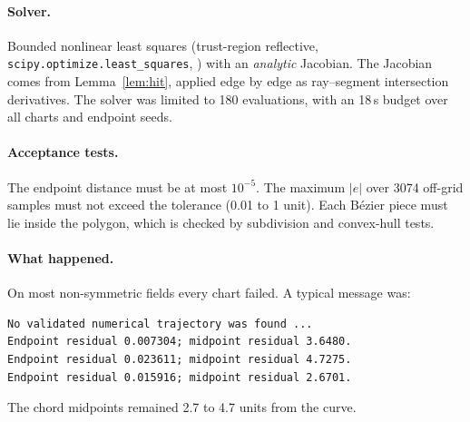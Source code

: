 \documentclass[11pt,a4paper]{article}
\numberwithin{equation}{section}
\theoremstyle{plain}
\theoremstyle{definition}
\theoremstyle{remark}
\begin{document}
\paragraph{Solver.} Bounded nonlinear least squares (trust-region reflective, \texttt{scipy.optimize.\allowbreak least\_squares}, \citealp{virtanen2020}) with an \emph{analytic} Jacobian. The Jacobian comes from Lemma~\ref{lem:hit}, applied edge by edge as ray--segment intersection derivatives. The solver was limited to 180 evaluations, with an 18\,s budget over all charts and endpoint seeds.

\paragraph{Acceptance tests.} The endpoint distance must be at most $10^{-5}$. The maximum $|e|$ over 3074 off-grid samples must not exceed the tolerance (0.01 to 1 unit). Each B\'ezier piece must lie inside the polygon, which is checked by subdivision and convex-hull tests.

\paragraph{What happened.} On most non-symmetric fields every chart failed. A typical message was:
\begin{verbatim}
No validated numerical trajectory was found ...
Endpoint residual 0.007304; midpoint residual 3.6480.
Endpoint residual 0.023611; midpoint residual 4.7275.
Endpoint residual 0.015916; midpoint residual 2.6701.
\end{verbatim}
The chord midpoints remained 2.7 to 4.7 units from the curve.
\end{document}
